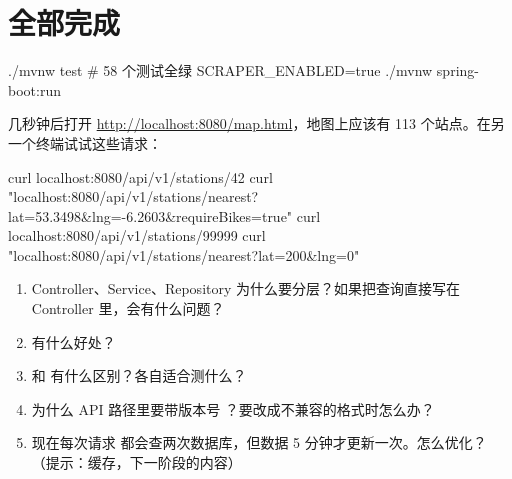 \section{全部完成}

\begin{shell}
./mvnw test                                  # 58 个测试全绿
SCRAPER_ENABLED=true ./mvnw spring-boot:run
\end{shell}

几秒钟后打开 \url{http://localhost:8080/map.html}，地图上应该有 113 个站点。在另一个终端试试这些请求：

\begin{shell}
curl localhost:8080/api/v1/stations/42
curl "localhost:8080/api/v1/stations/nearest?lat=53.3498&lng=-6.2603&requireBikes=true"
curl localhost:8080/api/v1/stations/99999
curl "localhost:8080/api/v1/stations/nearest?lat=200&lng=0"
\end{shell}

\begin{think}
\begin{enumerate}
  \item Controller、Service、Repository 为什么要分层？如果把查询直接写在 Controller 里，会有什么问题？
  \item {} 有什么好处？
  \item {} 和  有什么区别？各自适合测什么？
  \item 为什么 API 路径里要带版本号 ？要改成不兼容的格式时怎么办？
  \item 现在每次请求  都会查两次数据库，但数据 5 分钟才更新一次。怎么优化？（提示：缓存，下一阶段的内容）
\end{enumerate}
\end{think}
